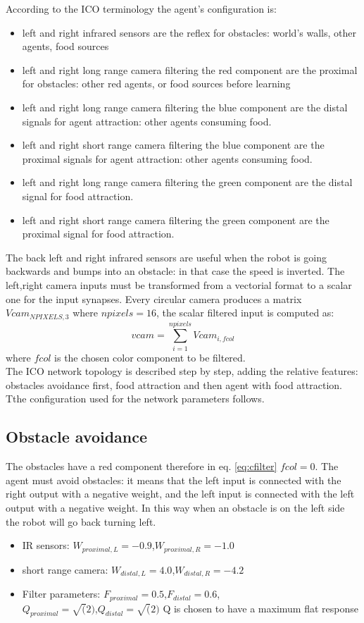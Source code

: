 According to the ICO terminology the agent's configuration is:
\begin{itemize}
\item left and right infrared sensors are the reflex for obstacles:
world's walls, other agents, food sources
\item left and right long range camera filtering the red component
are the proximal for obstacles: other red agents, or food sources before learning
\item left and right long range camera filtering the blue component
are the distal signals for agent attraction: other agents consuming food.
\item left and right short range camera filtering the blue component
are the proximal signals for agent attraction: other agents consuming food.
\item left and right long range camera filtering the green component
are the distal signal for food attraction.
\item left and right short range camera filtering the green component
are the proximal signal for food attraction.

\end{itemize}
The back left and right infrared sensors are useful when the robot is going
backwards and bumps into an obstacle: in that case the speed is inverted.
The left,right camera inputs must be transformed from a vectorial format
to a scalar one for the input synapses. Every circular camera produces a
matrix $Vcam_{NPIXELS,3}$ where $npixels=16$, the scalar filtered input
is computed as:
\begin{equation}
vcam=\sum_{i=1}^{npixels} Vcam_{i,fcol}
\label{eq:cfilter}
\end{equation}
where $fcol$ is the chosen color component to be filtered.\\
The ICO network topology is described step by step, adding the relative features:
obstacles avoidance first, food attraction and then agent with food attraction.
Tthe configuration used for the network parameters follows.
\subsection{Obstacle avoidance}
The obstacles have a red component therefore in eq. \ref{eq:cfilter} $fcol=0$.
The agent must avoid obstacles: it means that the left input is connected with
the right output with a negative weight, and the left input is connected with
the left output with a negative weight. In this way when an obstacle is on
the left side the robot will go back turning left.
\begin{itemize}
 \item IR sensors: $W_{proximal,L}=-0.9$,$W_{proximal,R}=-1.0$
 \item short range camera: $W_{distal,L}=4.0$,$W_{distal,R}=-4.2$
 \item Filter parameters: $F_{proximal}=0.5$,$F_{distal}=0.6$,\\ $Q_{proximal}=\sqrt(2)$,$Q_{distal}=\sqrt(2)$
 Q is chosen to have a maximum flat response
\end{itemize}

